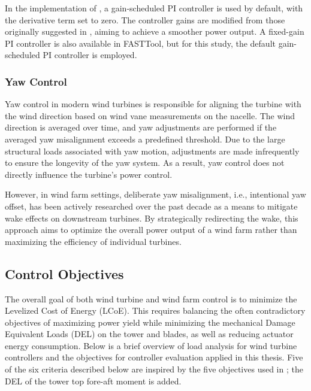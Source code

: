 In the implementation of \cite{mulders2020wind}, a gain-scheduled PI controller is used by default, with the derivative term set to zero. The controller gains are modified from those originally suggested in \cite{jonkman2009definition}, aiming to achieve a smoother power output. A fixed-gain PI controller is also available in FASTTool, but for this study, the default gain-scheduled PI controller is employed.

\subsubsection{Yaw Control}
Yaw control in modern wind turbines is responsible for aligning the turbine with the wind direction based on wind vane measurements on the nacelle. The wind direction is averaged over time, and yaw adjustments are performed if the averaged yaw misalignment exceeds a predefined threshold. Due to the large structural loads associated with yaw motion, adjustments are made infrequently to ensure the longevity of the yaw system. As a result, yaw control does not directly influence the turbine's power control.

However, in wind farm settings, deliberate yaw misalignment, i.e., intentional yaw offset, has been actively researched over the past decade as a means to mitigate wake effects on downstream turbines. By strategically redirecting the wake, this approach aims to optimize the overall power output of a wind farm rather than maximizing the efficiency of individual turbines.

\subsection{Control Objectives}\label{subsection Control Objectives}
The overall goal of both wind turbine and wind farm control is to minimize the Levelized Cost of Energy (LCoE). This requires balancing the often contradictory objectives of maximizing power yield while minimizing the mechanical Damage Equivalent Loads (DEL) on the tower and blades, as well as reducing actuator energy consumption. Below is a brief overview of load analysis for wind turbine controllers and the objectives for controller evaluation applied in this thesis. Five of the six criteria described below are inspired by the five objectives used in \cite{hoffmann2018load}; the DEL of the tower top fore-aft moment is added. 



